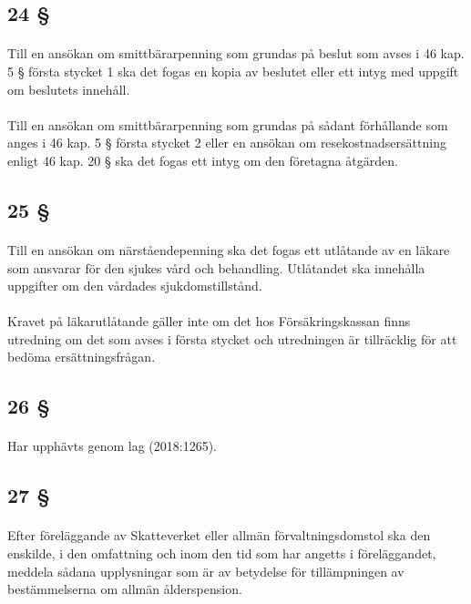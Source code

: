 \documentclass[a4paper,notitlepage,openany,10pt]{book}
\begin{document}
\subsection*{24 §}
\paragraph*{}
Till en ansökan om smittbärarpenning som grundas på beslut som avses i 46 kap. 5 § första stycket 1 ska det fogas en kopia av beslutet eller ett intyg med uppgift om beslutets innehåll.
\paragraph*{}
Till en ansökan om smittbärarpenning som grundas på sådant förhållande som anges i 46 kap. 5 § första stycket 2 eller en ansökan om resekostnadsersättning enligt 46 kap. 20 § ska det fogas ett intyg om den företagna åtgärden.
\subsection*{25 §}
\paragraph*{}
Till en ansökan om närståendepenning ska det fogas ett utlåtande av en läkare som ansvarar för den sjukes vård och behandling. Utlåtandet ska innehålla uppgifter om den vårdades sjukdomstillstånd.
\paragraph*{}
Kravet på läkarutlåtande gäller inte om det hos Försäkringskassan finns utredning om det som avses i första stycket och utredningen är tillräcklig för att bedöma ersättningsfrågan.
\subsection*{26 §}
\paragraph*{}
Har upphävts genom
lag (2018:1265).
\subsection*{27 §}
\paragraph*{}
Efter föreläggande av Skatteverket eller allmän förvaltningsdomstol ska den enskilde, i den omfattning och inom den tid som har angetts i föreläggandet, meddela sådana upplysningar som är av betydelse för tillämpningen av bestämmelserna om allmän ålderspension.
\end{document}

